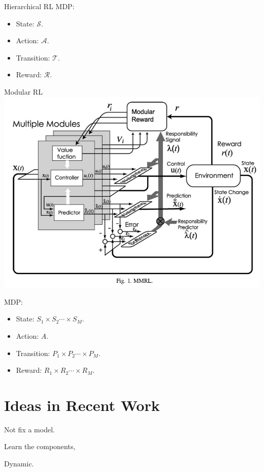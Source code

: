 Hierarchical RL
MDP:
\begin{itemize}
  \item State: {\color{red}$\mathcal{S}$}.
  \item Action: {\color{red}$\mathcal{A}$}.
  \item Transition: {\color{red}$\mathcal{T}$}.
  \item Reward: {\color{red}$\mathcal{R}$}.
\end{itemize}



Modular RL
\includegraphics[width=0.8\columnwidth]{mrl.png}



MDP:
\begin{itemize}
  \item State: {\color{red}$S_1 \times S_2 \cdots \times S_M $}.
  \item Action: $A$.
  \item Transition: {\color{red}$P_1 \times P_2 \cdots \times P_M $}.
  \item Reward: {\color{red}$R_1 \times R_2 \cdots \times R_M $}.
\end{itemize}




\section{Ideas in Recent Work}

Not fix a model.

Learn the components,

Dynamic.
